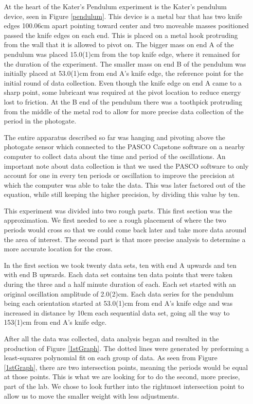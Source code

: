 \documentclass[aps,prl,10pt,twocolumn,floatfix]{revtex4-2}
\begin{document}
At the heart of the Kater's Pendulum experiment is the Kater's pendulum device, seen in Figure \ref{pendulum}. 
This device is a metal bar that has two knife edges 100.06cm apart pointing toward center and two moveable masses positioned passed the knife edges on each end. 
This is placed on a metal hook protruding from the wall that it is allowed to pivot on. 
The bigger mass on end A of the pendulum was placed 15.0(1)cm from the top knife edge, where it remained for the duration of the experiment. 
The smaller mass on end B of the pendulum was initially placed at 53.0(1)cm from end A's knife edge, the reference point for the initial round of data collection. 
Even though the knife edge on end A came to a sharp point, some lubricant was required at the pivot location to reduce energy lost to friction. 
At the B end of the pendulum there was a toothpick protruding from the middle of the metal rod to allow for more precise data collection of the period in the photogate. 

The entire apparatus described so far was hanging and pivoting above the photogate sensor which connected to the PASCO Capstone software on a nearby computer to collect data about the time and period of the oscillations. 
An important note about data collection is that we used the PASCO software to only account for one in every ten periods or oscillation to improve the precision at which the computer was able to take the data.
This was later factored out of the equation, while still keeping the higher precision, by dividing this value by ten. 

This experiment was divided into two rough parts. 
This first section was the approximation.
We first needed to see a rough placement of where the two periods would cross so that we could come back later and take more data around the area of interest.
The second part is that more precise analysis to determine a more accurate location for the cross.

In the first section we took twenty data sets, ten with end A upwards and ten with end B upwards. 
Each data set contains ten data points that were taken during the three and a half minute duration of each.
Each set started with an original oscillation amplitude of 2.0(2)cm.
Each data series for the pendulum being each orientation started at 53.0(1)cm from end A's knife edge and was increased in distance by 10cm each sequential data set, going all the way to 153(1)cm from end A's knife edge. 

After all the data was collected, data analysis began and resulted in the production of Figure \ref{1stGraph}.
The dotted lines were generated by preforming a least-squares polynomial fit on each group of data.
As seen from Figure \ref{1stGraph}, there are two intersection points, meaning the periods would be equal at those points.
This is what we are looking for to do the second, more precise, part of the lab.
We chose to look further into the rightmost intersection point to allow us to move the smaller weight with less adjustments.
\end{document}
